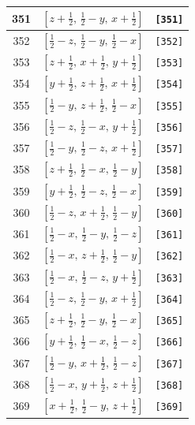 \documentclass[fleqn,8pt]{jsarticle}
\begin{document}
\begin{longtable}{ccc}
351 & $\left[ z + \frac{1}{2},\, \frac{1}{2} - y,\, x + \frac{1}{2} \right]$ & {\tt [351]} \\ \hline
352 & $\left[ \frac{1}{2} - z,\, \frac{1}{2} - y,\, \frac{1}{2} - x \right]$ & {\tt [352]} \\ \hline
353 & $\left[ z + \frac{1}{2},\, x + \frac{1}{2},\, y + \frac{1}{2} \right]$ & {\tt [353]} \\ \hline
354 & $\left[ y + \frac{1}{2},\, z + \frac{1}{2},\, x + \frac{1}{2} \right]$ & {\tt [354]} \\ \hline
355 & $\left[ \frac{1}{2} - y,\, z + \frac{1}{2},\, \frac{1}{2} - x \right]$ & {\tt [355]} \\ \hline
356 & $\left[ \frac{1}{2} - z,\, \frac{1}{2} - x,\, y + \frac{1}{2} \right]$ & {\tt [356]} \\ \hline
357 & $\left[ \frac{1}{2} - y,\, \frac{1}{2} - z,\, x + \frac{1}{2} \right]$ & {\tt [357]} \\ \hline
358 & $\left[ z + \frac{1}{2},\, \frac{1}{2} - x,\, \frac{1}{2} - y \right]$ & {\tt [358]} \\ \hline
359 & $\left[ y + \frac{1}{2},\, \frac{1}{2} - z,\, \frac{1}{2} - x \right]$ & {\tt [359]} \\ \hline
360 & $\left[ \frac{1}{2} - z,\, x + \frac{1}{2},\, \frac{1}{2} - y \right]$ & {\tt [360]} \\ \hline
361 & $\left[ \frac{1}{2} - x,\, \frac{1}{2} - y,\, \frac{1}{2} - z \right]$ & {\tt [361]} \\ \hline
362 & $\left[ \frac{1}{2} - x,\, z + \frac{1}{2},\, \frac{1}{2} - y \right]$ & {\tt [362]} \\ \hline
363 & $\left[ \frac{1}{2} - x,\, \frac{1}{2} - z,\, y + \frac{1}{2} \right]$ & {\tt [363]} \\ \hline
364 & $\left[ \frac{1}{2} - z,\, \frac{1}{2} - y,\, x + \frac{1}{2} \right]$ & {\tt [364]} \\ \hline
365 & $\left[ z + \frac{1}{2},\, \frac{1}{2} - y,\, \frac{1}{2} - x \right]$ & {\tt [365]} \\ \hline
366 & $\left[ y + \frac{1}{2},\, \frac{1}{2} - x,\, \frac{1}{2} - z \right]$ & {\tt [366]} \\ \hline
367 & $\left[ \frac{1}{2} - y,\, x + \frac{1}{2},\, \frac{1}{2} - z \right]$ & {\tt [367]} \\ \hline
368 & $\left[ \frac{1}{2} - x,\, y + \frac{1}{2},\, z + \frac{1}{2} \right]$ & {\tt [368]} \\ \hline
369 & $\left[ x + \frac{1}{2},\, \frac{1}{2} - y,\, z + \frac{1}{2} \right]$ & {\tt [369]} \\ \hline

\end{longtable}
\end{document}
